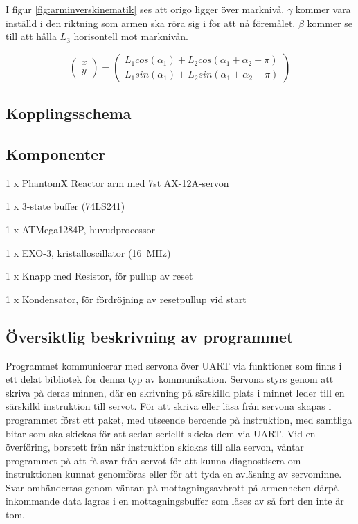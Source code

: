 
I figur \ref{fig:arminverskinematik} ses att origo ligger över marknivå. $\gamma$ kommer vara inställd i den riktning som armen ska röra sig i för att nå föremålet. $\beta$ kommer se till att hålla $L_{3}$ horisontell mot marknivån.

$$
\begin{pmatrix}
	x \\
	y
\end{pmatrix}
 = 
\begin{pmatrix}
	L_{1}cos(\alpha_{1}) + L_{2}cos(\alpha_{1} + \alpha_{2} - \pi) \\
	L_{1}sin(\alpha_{1}) + L_{2}sin(\alpha_{1} + \alpha_{2} - \pi)
\end{pmatrix}$$

\subsection{Kopplingsschema}


\subsection{Komponenter}

\begin{packed_itemize}
\item 1 x PhantomX Reactor arm med 7st AX-12A-servon
\item 1 x 3-state buffer (74LS241)
\item 1 x ATMega1284P, huvudprocessor
\item 1 x EXO-3, kristalloscillator (16~MHz)
\item 1 x Knapp med Resistor, för pullup av reset
\item 1 x Kondensator, för fördröjning av resetpullup vid start
\end{packed_itemize}


\subsection{Översiktlig beskrivning av programmet}

Programmet kommunicerar med servona över UART via funktioner som finns i ett delat bibliotek för denna typ av kommunikation. Servona styrs genom att skriva på deras minnen, där en skrivning på särskilld plats i minnet leder till en särskilld instruktion till servot. För att skriva eller läsa från servona skapas i programmet först ett paket, med utseende beroende på instruktion, med samtliga bitar som ska skickas för att sedan seriellt skicka dem via UART. Vid en överföring, borstett från när instruktion skickas till alla servon, väntar programmet på att få svar från servot för att kunna diagnostisera om instruktionen kunnat genomföras eller för att tyda en avläsning av servominne. Svar omhändertas genom väntan på mottagningsavbrott på armenheten därpå inkommande data lagras i en mottagningsbuffer som läses av så fort den inte är tom.

